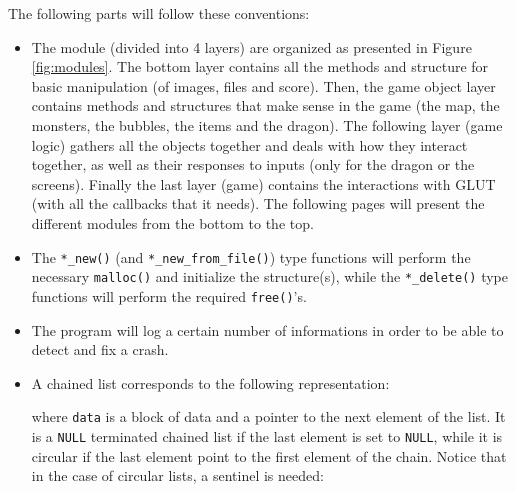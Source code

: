 \documentclass[12pt,a4paper]{article}
\begin{document}
The following parts will follow these conventions:

\begin{itemize}
\item The module (divided into 4 layers) are organized as presented in Figure \ref{fig:modules}. The bottom layer contains all the methods and structure for basic manipulation (of images, files and score). Then, the game object layer contains methods and structures that make sense in the game (the map, the monsters, the bubbles, the items and the dragon). The following layer (game logic) gathers all the objects together and deals with how they interact together, as well as their responses to inputs (only for the dragon or the screens). Finally the last layer (game) contains the interactions with GLUT (with all the callbacks that it needs). The following pages will present the different modules from the bottom to the top.
\item The \texttt{*_new()}  (and \texttt{*_new_from_file()}) type functions will perform the necessary \texttt{malloc()} and initialize the structure(s), while the \texttt{*_delete()} type functions will perform the required \texttt{free()}'s.
\item The program will log a certain number of informations in order to be able to detect and fix a crash.
\item A chained list corresponds to the following representation:\begin{center}
\end{center}
where \texttt{data} is a block of data and  a pointer to the next element of the list. It is a \texttt{NULL} terminated chained list if the last element is set to \texttt{NULL}, while it is circular if the last element point to the first element of the chain. Notice that in the case of circular lists, a sentinel is needed: \begin{center}
\end{center}
\end{itemize}
\end{document}
